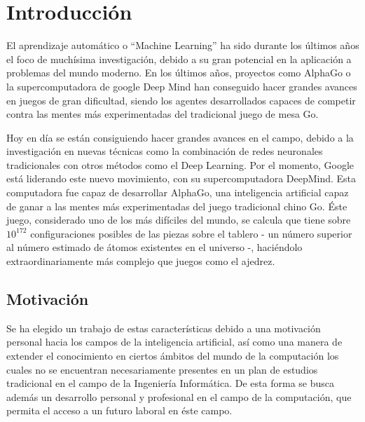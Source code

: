 \documentclass[11pt,spanish,listoffigures,listoftables]{tfgetsinf}
\begin{document}

\mainmatter


\chapter{Introducción}

El aprendizaje automático o “Machine Learning” ha sido durante los últimos años el foco de muchísima investigación, debido a su gran potencial en la aplicación a problemas del mundo moderno. En los últimos años, proyectos como AlphaGo o la supercomputadora de google Deep Mind han conseguido hacer grandes avances en juegos de gran dificultad, siendo los agentes desarrollados capaces de competir contra las mentes más experimentadas del tradicional juego de mesa Go. 

Hoy en día se están consiguiendo hacer grandes avances en el campo, debido a la investigación en nuevas técnicas como la combinación de redes neuronales tradicionales con otros métodos como el Deep Learning. Por el momento, Google está liderando este nuevo movimiento, con su supercomputadora DeepMind. Esta computadora fue capaz de desarrollar AlphaGo, una inteligencia artificial capaz de ganar a las mentes más experimentadas del juego tradicional chino Go. Éste juego, considerado uno de los más difíciles del mundo, se calcula que tiene sobre $10^{172}$ configuraciones posibles de las piezas sobre el tablero - un número superior al número estimado de átomos existentes en el universo -, haciéndolo extraordinariamente más complejo que juegos como el ajedrez.




\section{Motivaci\'on}



Se ha elegido un trabajo de estas características debido a una motivación personal hacia los campos de la inteligencia artificial, así como una manera de extender el conocimiento en ciertos ámbitos del mundo de la computación los cuales no se encuentran necesariamente presentes en un plan de estudios tradicional en el campo de la Ingeniería Informática. De esta forma se busca además un desarrollo personal y profesional en el campo de la computación, que permita el acceso a un futuro laboral en éste campo.  \par 
\end{document}
